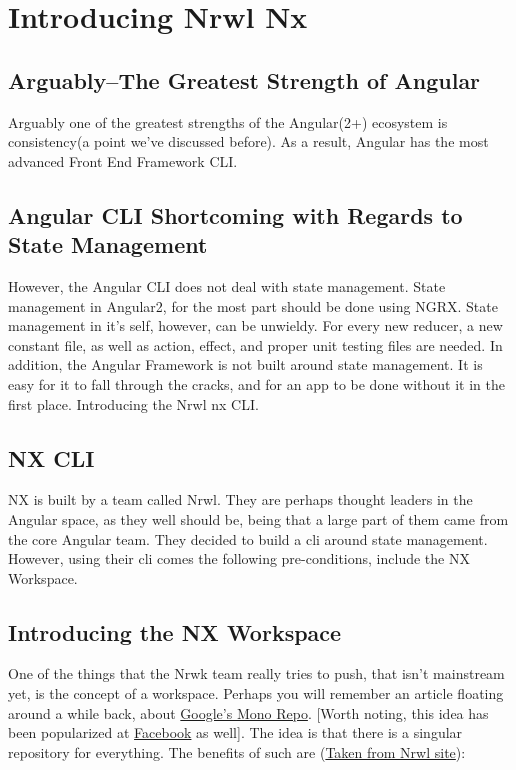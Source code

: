 \maketitle{}
\section{Introducing Nrwl Nx}

\subsection{Arguably–The Greatest Strength of Angular}

Arguably one of the greatest strengths of the Angular(2+) ecosystem is
consistency(a point we've discussed before). As a result, Angular has the most
advanced Front End Framework CLI.

\subsection{Angular CLI Shortcoming with Regards to State Management}

However, the Angular CLI does not deal with state management. State management
in Angular2, for the most part should be done using NGRX. State management in
it's self, however, can be unwieldy. For every new reducer, a new constant file,
as well as action, effect, and proper unit testing files are needed.
In addition, the Angular Framework is not built around state management. It is
easy for it to fall through the cracks, and for an app to be done without it in
the first place. Introducing the Nrwl nx CLI.

\subsection{NX CLI}
NX is built by a team called Nrwl. They are perhaps thought leaders in the
Angular space, as they well should be, being that a large part of them came
from the core Angular team. They decided to build a cli around state management.
However, using their cli comes the following pre-conditions, include the NX
Workspace.

\subsection{Introducing the NX Workspace}
One of the things that the Nrwk team really tries to push, that isn't mainstream
yet, is the concept of a workspace. Perhaps you will remember an article
floating around a while back, about
\href{https://cacm.acm.org/magazines/2016/7/204032-why-google-stores-billions-of-lines-of-code-in-a-single-repository/fulltext}
{Google's Mono Repo}. [Worth noting, this idea
has been popularized at
\href{https://code.facebook.com/posts/218678814984400/scaling-mercurial-at-facebook/}{Facebook}
as well]. The idea is that there is a singular repository for everything.
The benefits of such are
(\href{https://nrwl.io/nx/why-a-workspace}{Taken from Nrwl site}):

